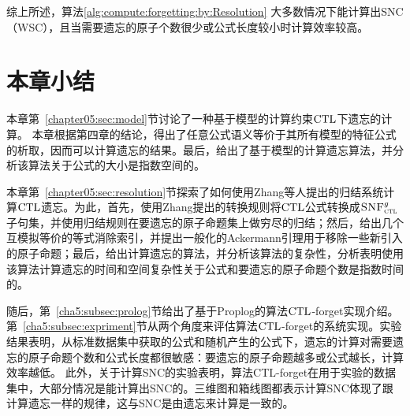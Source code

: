综上所述，算法\ref{alg:compute:forgetting:by:Resolution} 大多数情况下能计算出SNC（WSC），且当需要遗忘的原子个数很少或公式长度较小时计算效率较高。


\section{本章小结}
本章第~\ref{chapter05:sec:model}节讨论了一种基于模型的计算约束$\textrm{CTL}$下遗忘的计算。
本章根据第四章的结论，得出了任意公式语义等价于其所有模型的特征公式的析取，因而可以计算遗忘的结果。最后，给出了基于模型的计算遗忘算法，并分析该算法关于公式的大小是指数空间的。

本章第~\ref{chapter05:sec:resolution}节探索了如何使用Zhang等人提出的归结系统计算$\textrm{CTL}$遗忘。为此，首先，使用Zhang提出的转换规则将$\textrm{CTL}$公式转换成${\textsc{SNF}_{\textsc{ctl}}^g}$子句集，并使用归结规则在要遗忘的原子命题集上做穷尽的归结；然后，给出几个互模拟等价的等式消除索引，并提出一般化的Ackermann引理用于移除一些新引入的原子命题；最后，给出计算遗忘的算法，并分析该算法的复杂性，分析表明使用该算法计算遗忘的时间和空间复杂性关于公式和要遗忘的原子命题个数是指数时间的。


随后，第~\ref{cha5:subsec:prolog}节给出了基于Proplog的算法$\textrm{CTL}$-forget实现介绍。第~\ref{cha5:subsec:expriment}节从两个角度来评估算法$\textrm{CTL}$-forget的系统实现。实验结果表明，从标准数据集中获取的公式和随机产生的公式下，遗忘的计算对需要遗忘的原子命题个数和公式长度都很敏感：要遗忘的原子命题越多或公式越长，计算效率越低。
此外，关于计算SNC的实验表明，算法CTL-forget在用于实验的数据集中，大部分情况是能计算出SNC的。三维图和箱线图都表示计算SNC体现了跟计算遗忘一样的规律，这与SNC是由遗忘来计算是一致的。
